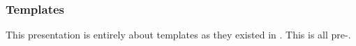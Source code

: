 \begin{frame}[fragile,t]
\frametitle{ Templates}
\begin{center}
This presentation is entirely about templates as they existed in
.
\vskip 24pt
This is all pre-.
\end{center}

\end{frame}
